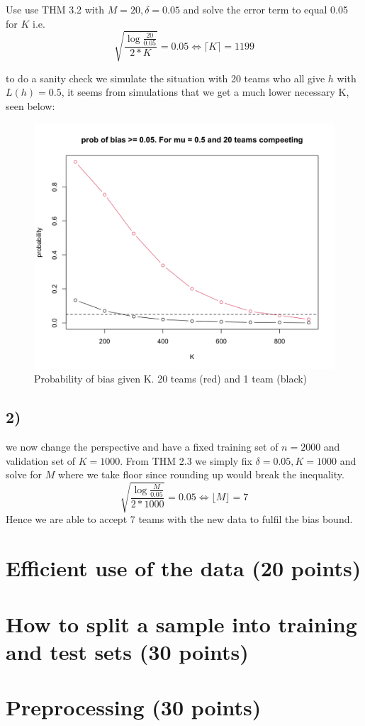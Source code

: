 \documentclass[a4paper,12pt]{article}
\begin{document}
Use use THM 3.2 with $M=20, \delta = 0.05$ and solve the error term to equal 0.05 for $K$ i.e.
$$
\sqrt{\frac{\log\frac{20}{0.05}}{2*K}} = 0.05 \Leftrightarrow \lceil K \rceil = 1199 
$$


to do a sanity check we simulate the situation with 20 teams who all give $h$ with $L(h) = 0.5$, it seems from simulations that we get a much lower necessary K, seen below:

\begin{figure}[htbp]
    \centering
    \includegraphics[width=0.5\linewidth]{1_1_b.png}
    \caption{Probability of bias given K. 20 teams (red) and 1 team (black)} %
    \label{fig:2}
\end{figure}

\newpage

\subsection*{2)}
we now change the perspective and have a fixed training set of $n = 2000$ and validation set of $K = 1000$.
From THM 2.3 we simply fix $\delta = 0.05, K = 1000$ and solve for $M$ where we take floor since rounding up would break the inequality.
$$
\sqrt{\frac{\log\frac{M}{0.05}}{2*1000}} = 0.05 \Leftrightarrow \lfloor M \rfloor = 7 
$$
Hence we are able to accept 7 teams with the new data to fulfil the bias bound.

\section{Efficient use of the data (20 points)}

\section{How to split a sample into training and test sets (30 points)}

\section{Preprocessing (30 points)}
\end{document}
